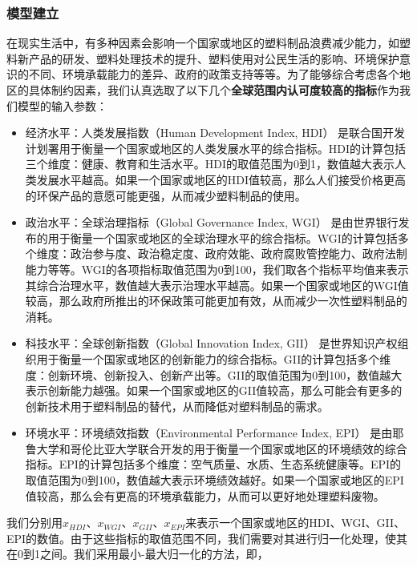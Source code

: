 \documentclass[UTF8, fontset=windows]{mcmthesis}
\begin{document}
\subsubsection{模型建立}

在现实生活中，有多种因素会影响一个国家或地区的塑料制品浪费减少能力，如塑料新产品的研发、塑料处理技术的提升、塑料使用对公民生活的影响、环境保护意识的不同、环境承载能力的差异、政府的政策支持等等。为了能够综合考虑各个地区的具体制约因素，我们认真选取了以下几个\textbf{全球范围内认可度较高的指标}作为我们模型的输入参数：

\begin{itemize}
  \item 经济水平：人类发展指数（Human Development Index, HDI）\cite{UNDP_HDI} 是联合国开发计划署用于衡量一个国家或地区的人类发展水平的综合指标。HDI的计算包括三个维度：健康、教育和生活水平。HDI的取值范围为0到1，数值越大表示人类发展水平越高。如果一个国家或地区的HDI值较高，那么人们接受价格更高的环保产品的意愿可能更强，从而减少塑料制品的使用。
  \item 政治水平：全球治理指标（Global Governance Index, WGI）\cite{WorldBank_WGI} 是由世界银行发布的用于衡量一个国家或地区的全球治理水平的综合指标。WGI的计算包括多个维度：政治参与度、政治稳定度、政府效能、政府腐败管控能力、政府法制能力等等。WGI的各项指标取值范围为0到100，我们取各个指标平均值来表示其综合治理水平，数值越大表示治理水平越高。如果一个国家或地区的WGI值较高，那么政府所推出的环保政策可能更加有效，从而减少一次性塑料制品的消耗。
  \item 科技水平：全球创新指数（Global Innovation Index, GII）\cite{WIPO_GII} 是世界知识产权组织用于衡量一个国家或地区的创新能力的综合指标。GII的计算包括多个维度：创新环境、创新投入、创新产出等。GII的取值范围为0到100，数值越大表示创新能力越强。如果一个国家或地区的GII值较高，那么可能会有更多的创新技术用于塑料制品的替代，从而降低对塑料制品的需求。
  \item 环境水平：环境绩效指数（Environmental Performance Index, EPI）\cite{EPI_Report} 是由耶鲁大学和哥伦比亚大学联合开发的用于衡量一个国家或地区的环境绩效的综合指标。EPI的计算包括多个维度：空气质量、水质、生态系统健康等。EPI的取值范围为0到100，数值越大表示环境绩效越好。如果一个国家或地区的EPI值较高，那么会有更高的环境承载能力，从而可以更好地处理塑料废物。
\end{itemize}

我们分别用$x_{HDI}$、$x_{WGI}$、$x_{GII}$、$x_{EPI}$来表示一个国家或地区的HDI、WGI、GII、EPI的数值。由于这些指标的取值范围不同，我们需要对其进行归一化处理，使其在0到1之间。我们采用最小-最大归一化的方法，即，
\end{document}
